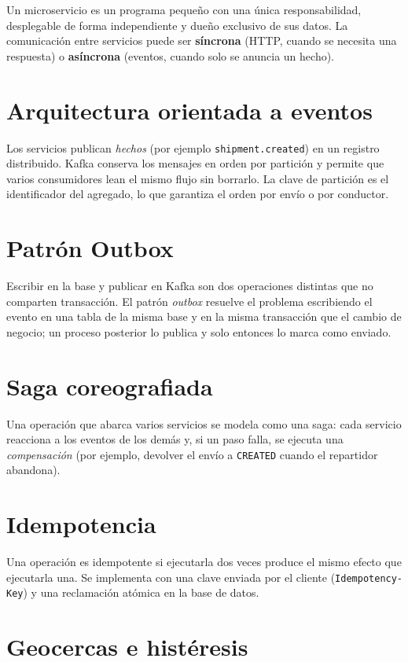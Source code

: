 \documentclass[10pt,letterpaper,twocolumn,oneside]{report}
\newcommand{\pkg}[1]{\texttt{#1}}
\begin{document}
Un microservicio es un programa pequeño con una única responsabilidad, desplegable de forma
independiente y dueño exclusivo de sus datos. La comunicación entre servicios puede ser
\textbf{síncrona} (HTTP, cuando se necesita una respuesta) o \textbf{asíncrona} (eventos, cuando
solo se anuncia un hecho).

\section{Arquitectura orientada a eventos}

Los servicios publican \emph{hechos} (por ejemplo \pkg{shipment.created}) en un registro
distribuido. Kafka conserva los mensajes en orden por partición y permite que varios consumidores
lean el mismo flujo sin borrarlo. La clave de partición es el identificador del agregado, lo que
garantiza el orden por envío o por conductor.

\section{Patrón Outbox}

Escribir en la base y publicar en Kafka son dos operaciones distintas que no comparten
transacción. El patrón \emph{outbox} resuelve el problema escribiendo el evento en una tabla de
la misma base y en la misma transacción que el cambio de negocio; un proceso posterior lo publica
y solo entonces lo marca como enviado.

\section{Saga coreografiada}

Una operación que abarca varios servicios se modela como una saga: cada servicio reacciona a los
eventos de los demás y, si un paso falla, se ejecuta una \emph{compensación} (por ejemplo,
devolver el envío a \texttt{CREATED} cuando el repartidor abandona).

\section{Idempotencia}

Una operación es idempotente si ejecutarla dos veces produce el mismo efecto que ejecutarla una.
Se implementa con una clave enviada por el cliente (\pkg{Idempotency-Key}) y una reclamación
atómica en la base de datos.

\section{Geocercas e histéresis}
\end{document}
